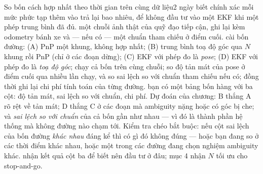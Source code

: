 \documentclass[../../marker.tex]{subfiles}
\begin{document}
\begin{duan}{So bốn cách hợp nhất theo thời gian trên cùng dữ liệu}{2 ngày}
\dmt biết chính xác mỗi mức phức tạp thêm vào trả lại bao nhiêu, để không đầu tư vào một EKF khi một phép trung bình đã đủ.
\ddl một chuỗi ảnh thật của quỹ đạo tiếp cận, ghi lại kèm odometry bánh xe và --- nếu có --- một chuẩn tham chiếu ở điểm cuối.
\dbc cài bốn đường: (A) PnP một khung, không hợp nhất; (B) trung bình toạ độ góc qua \(N\) khung rồi PnP (chỉ ở các đoạn dừng); (C) EKF với phép đo là \emph{pose}; (D) EKF với phép đo là \emph{toạ độ góc}; chạy cả bốn trên cùng chuỗi; so độ tản mát của pose ở điểm cuối qua nhiều lần chạy, và so sai lệch so với chuẩn tham chiếu nếu có; đồng thời ghi lại chi phí tính toán của từng đường.
\dxk bạn có một bảng bốn hàng với ba cột: độ tản mát, sai lệch so với chuẩn, chi phí. Dự đoán của chương: B thắng A rõ rệt về tản mát; D thắng C ở các đoạn mà ambiguity nặng hoặc có góc bị che; và \emph{sai lệch so với chuẩn} của cả bốn gần như nhau --- vì đó là thành phần hệ thống mà không đường nào chạm tới. Kiểm tra chéo bắt buộc: nếu cột sai lệch của bốn đường \emph{khác nhau} đáng kể thì có gì đó không đúng --- hoặc bạn đang so ở các thời điểm khác nhau, hoặc một trong các đường đang chọn nghiệm ambiguity khác.
\dnv {} nhận kết quả cột ba để biết nên đầu tư ở đâu;  mục 4 nhận \(N\) tối ưu cho stop-and-go.
\end{duan}
\end{document}
